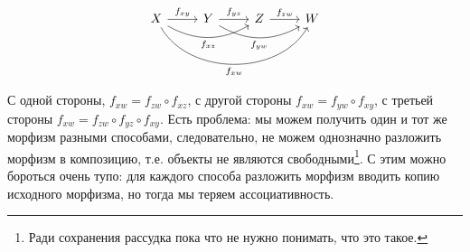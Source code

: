 \begin{example}
    \[\begin{tikzcd}
            X \arrow{r}{f_{xy}} \arrow[bend right, swap]{rr}{f_{xz}} \arrow[bend right = 60, swap]{rrr}{f_{xw}} & Y \arrow{r}{f_{yz}} \arrow[bend right, swap]{rr}{f_{yw}} & Z \arrow{r}{f_{zw}} & W
        \end{tikzcd}\]

    С одной стороны, \(f_{xw} = f_{zw} \circ f_{xz}\), с другой стороны \(f_{xw} = f_{yw} \circ f_{xy}\), с третьей стороны \(f_{xw} = f_{zw} \circ f_{yz} \circ f_{xy}\). Есть проблема: мы можем получить один и тот же морфизм разными способами, следовательно, не можем однозначно разложить морфизм в композицию, т.е. объекты не являются свободными\footnote{Ради сохранения рассудка пока что не нужно понимать, что это такое.}. С этим можно бороться очень тупо: для каждого способа разложить морфизм вводить копию исходного морфизма, но тогда мы теряем ассоциативность.
\end{example}
